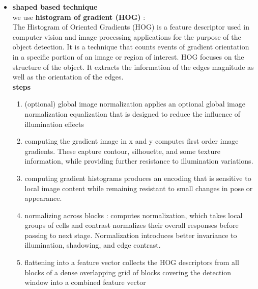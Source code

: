 \documentclass[pdftex,10pt,a4paper,oneside]{article}
\begin{document}
\begin{itemize}
\begin{enumerate}
	\end{enumerate}
\item \textbf{{\large shaped based technique}}\\
we use \textbf{histogram of gradient (HOG)} :\\
	The Histogram of Oriented Gradients (HOG) is a feature descriptor used in computer vision and image processing applications for the purpose of the object detection. It is a technique that counts events of gradient orientation in a specific portion of an image or region of interest. HOG focuses on the structure of the object. It extracts the information of the edges magnitude as well as the orientation of the edges.\\
\textbf{{\large steps}}\\
\begin{enumerate}
	\item (optional) global image normalization  applies an optional global image normalization equalization that is designed to reduce the influence of illumination effects
	\item	computing the gradient image in x and y computes first order image gradients. These capture contour, silhouette, and some texture information, while providing further resistance to illumination variations. 
	\item	computing gradient histograms produces an encoding that is sensitive to local image content while remaining resistant to small changes in pose or appearance. 
	\item	normalizing across blocks : computes normalization, which takes local groups of cells and contrast normalizes their overall responses before passing to next stage. Normalization introduces better invariance to illumination, shadowing, and edge contrast. 
\item	flattening into a feature vector  collects the HOG descriptors from all blocks of a dense overlapping grid of blocks covering the detection window into a combined feature vector
	
\end{enumerate}


	\end{itemize}
\end{document}
